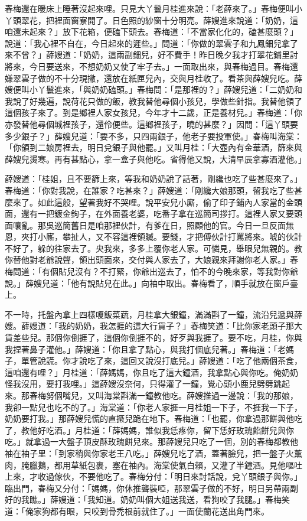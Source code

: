 春梅還在暖床上睡著沒起來哩。只見大丫鬟月桂進來說：「老薛來了。」春梅便叫小丫頭翠花，把裡面窗寮開了。日色照的紗窗十分明亮。薛嫂進來說道：「奶奶，這咱還未起來？」放下花箱，便磕下頭去。春梅道：「不當家化化的，磕甚麼頭？」說道：「我心裡不自在，今日起來的遲些。」問道：「你做的翠雲子和九鳳鈿兒拿了來不曾？」薛嫂道：「奶奶，這兩副鈿兒，好不費手！昨日晚夕我才打翠花鋪里討將來，今日要送來，不想奶奶又使了牢子去。」一面取出來，與春梅過目。春梅還嫌翠雲子做的不十分現撇，還放在紙匣兒內，交與月桂收了。看茶與薛嫂兒吃。薛嫂便叫小丫鬟進來，「與奶奶磕頭。」春梅問：「是那裡的？」薛嫂兒道：「二奶奶和我說了好幾遍，說荷花只做的飯，教我替他尋個小孩兒，學做些針指。我替他領了這個孩子來了。到是鄉裡人家女孩兒，今年才十二歲，正是養材兒。」春梅道：「你亦發替他尋個城裡孩子，還伶便些。這鄉裡孩子，曉的甚麼？」因問：「這丫頭要多少銀子？」薛嫂兒道：「要不多，只四兩銀子，他老子要投軍使。」春梅叫海棠：「你領到二娘房裡去，明日兌銀子與他罷。」又叫月桂：「大壺內有金華酒，篩來與薛嫂兒燙寒。再有甚點心，拿一盒子與他吃。省得他又說，大清早辰拿寡酒灌他。」

薛嫂道：「桂姐，且不要篩上來，等我和奶奶說了話著，剛纔也吃了些甚麼來了。」春梅道：「你對我說，在誰家？吃甚來？」薛嫂道：「剛纔大娘那頭，留我吃了些甚麼來了。如此這般，望著我好不哭哩。說平安兒小廝，偷了印子鋪內人家當的金頭面，還有一把鍍金鉤子，在外面養老婆，吃番子拿在巡簡司拶打。這裡人家又要頭面嚷亂。那吳巡簡舊日是咱那裡伙計，有爹在日，照顧他的官。今日一旦反面無恩，夾打小廝，攀扯人，又不容這裡領贓。要錢，才把傅伙計打罵將來。唬的伙計不好了，躲的往家去了。央我來，多多上覆你老人家。可憐見，舉眼兒無親的。教你替他對老爺說聲，領出頭面來，交付與人家去了，大娘親來拜謝你老人家。」春梅問道：「有個貼兒沒有？不打緊，你爺出巡去了，怕不的今晚來家，等我對你爺說。」薛嫂兒道：「他有說貼兒在此。」向袖中取出。春梅看了，順手就放在窗戶臺上。

不一時，托盤內拿上四樣嗄飯菜蔬，月桂拿大銀鐘，滿滿斟了一鐘，流沿兒遞與薛嫂。薛嫂道：「我的奶奶，我怎捱的這大行貨子？」春梅笑道：「比你家老頭子那大貨差些兒。那個你倒捱了，這個你倒捱不的，好歹與我捱了。要不吃，月桂，你與我捏著鼻子灌他。」薛嫂道：「你且拿了點心，與我打個底兒著。」春梅道：「老媽子，單管說謊。你才說吃了來，這回又說沒打底兒。」薛嫂道：「吃了他兩個茶食，這咱還有哩？」月桂道：「薛媽媽，你且吃了這大鐘酒，我拿點心與你吃。俺奶奶怪我沒用，要打我哩。」這薛嫂沒奈何，只得灌了一鐘，覺心頭小鹿兒劈劈跳起來。那春梅努個嘴兒，又叫海棠斟滿一鐘教他吃。薛嫂推過一邊說：「我的那娘，我卻一點兒也吃不的了。」海棠道：「你老人家捱一月桂姐一下子，不捱我一下子，奶奶要打我。」那薛嫂兒慌的直撅兒跪在地下。春梅道：「也罷，你拿過那餅與他吃了，教他好吃酒。」月桂道：「薛媽媽，誰似我恁疼你，留下恁好玫瑰餡餅兒與你吃。」就拿過一大盤子頂皮酥玫瑰餅兒來。那薛嫂兒只吃了一個，別的春梅都教他袖在袖子里：「到家稍與你家老王八吃。」薛嫂兒吃了酒，蓋著臉兒，把一盤子火薰肉，腌臘鵝，都用草紙包裹，塞在袖內。海棠使氣白賴，又灌了半鐘酒。見他嘔吐上來，才收過傢伙，不要他吃了。春梅分付：「明日來討話說，兌丫頭銀子與你。」臨出門，春梅又分付：「媽媽，你休推聾裝啞，那翠雲子做的不好，明日另帶兩副好的我瞧。」薛嫂道：「我知道。奶奶叫個大姐送我送，看狗咬了我腿。」春梅笑道：「俺家狗都有眼，只咬到骨禿根前就住了。」一面使蘭花送出角門來。

